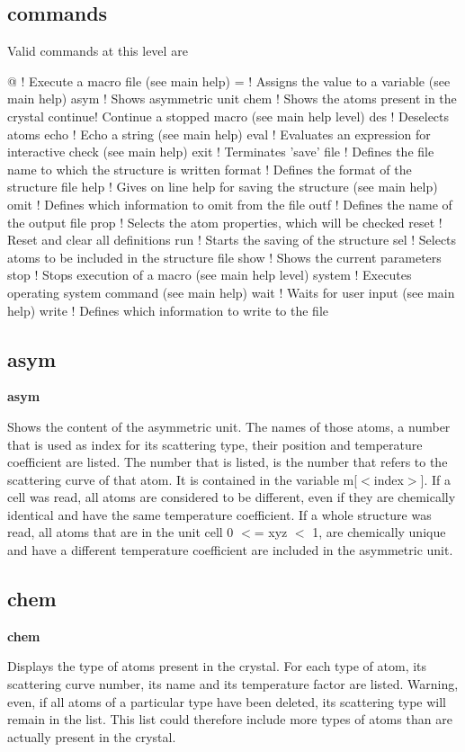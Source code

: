 \subsection*{commands}
Valid commands at this level are 
\par
\begin{MacVerbatim}
@       ! Execute a macro file (see main help)
=       ! Assigns the value to a variable (see main help)
asym    ! Shows asymmetric unit
chem    ! Shows the atoms present in the crystal
continue! Continue a stopped macro (see main help level)
des     ! Deselects atoms
echo    ! Echo a string (see main help)
eval    ! Evaluates an expression for interactive check (see main help)
exit    ! Terminates 'save'
file    ! Defines the file name to which the structure is written
format  ! Defines the format of the structure file
help    ! Gives on line help for saving the structure (see main help)
omit    ! Defines which information to omit from the file
outf    ! Defines the name of the output file
prop    ! Selects the atom properties, which will be checked
reset   ! Reset and clear all definitions
run     ! Starts the saving of the structure
sel     ! Selects atoms to be included in the structure file
show    ! Shows the current parameters
stop    ! Stops execution of a macro (see main help level)
system  ! Executes operating system command (see main help)
wait    ! Waits for user input (see main help)
write   ! Defines which information to write to the file
\end{MacVerbatim}
\subsection*{asym}
{\bf asym \par }
\par
\vspace{3pt}
Shows the content of the asymmetric unit. The names of those atoms, 
a number that is used as index for its scattering type, their position 
and temperature coefficient are listed. The number that is listed, 
is the number that refers to the scattering curve of that atom. It is 
contained in the variable m[$ <$index$> $]. If a cell was read, all atoms 
are considered to be different, even if they are chemically identical 
and have the same temperature coefficient. If a whole structure was 
read, all atoms that are in the unit cell 0 $ <$= xyz $ <$ 1, are chemically 
unique and have a different temperature coefficient are included in 
the asymmetric unit. 
\subsection*{chem}
{\bf chem \par }
\par
\vspace{3pt}
Displays the type of atoms present in the crystal. For each type of 
atom, its scattering curve number, its name and its temperature 
factor are listed. 
Warning, even, if all atoms of a particular type have been deleted, its 
scattering type will remain in the list. This list could therefore 
include more types of atoms than are actually present in the crystal. 
